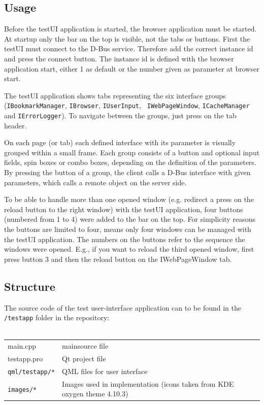 \documentclass{pelagicore}
\begin{document}
\subsection{Usage}
Before the testUI application is started, the browser application must be
started. At startup only the bar on the top is visible, not the tabs or
buttons. First the testUI must connect to the D-Bus service. Therefore add the
correct instance id and press the connect button. The instance id is defined
with the browser application start, either 1 as default or the number given as
parameter at browser start.

The testUI application shows tabs representing the six interface groups
({\tt IBook\-mark\-Manager}, {\tt IBrowser}, {\tt IUserInput}, {\tt
IWebPageWindow}, {\tt ICacheManager} and {\tt IErrorLogger}). To navigate
between the groups, just press on the tab header.

On each page (or tab) each defined interface with its parameter is visually
grouped within a small frame. Each group consists of a button and optional
input fields, spin boxes or combo boxes, depending on the definition of the
parameters. By pressing the button of a group, the client calls a D-Bus
interface with given parameters, which calls a remote object on the server
side.

To be able to handle more than one opened window (e.g. redirect a press on the
reload button to the right window) with the testUI application, four buttons
(numbered from 1 to 4) were added to the bar on the top. For simplicity reasons
the buttons are limited to four, means only four windows can be managed with
the testUI application. The numbers on the buttons refer to the sequence the
windows were opened. E.g., if you want to reload the third opened window, first
press button 3 and then the reload button on the IWebPageWindow tab.

\subsection{Structure}
The source code of the test user-interface application can to be found in the
{\tt /testapp} folder in the repository:
\\\\
\begin{tabularx}{0.9\textwidth}{l X}
    main.cpp            & mainsource file \\
    testapp.pro         & Qt project file \\
    {\tt qml/testapp/*} & QML files for user interface \\
    {\tt images/*}      & Images used in implementation (icons taken from KDE
                          oxygen theme 4.10.3)
\end{tabularx}
\\\\
\end{document}
